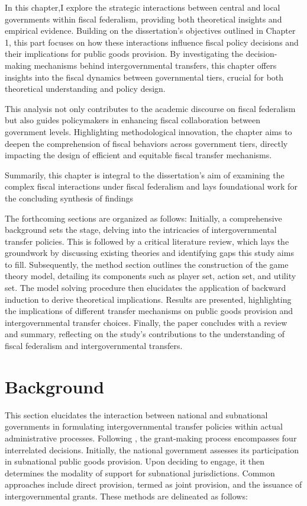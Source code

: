 In this chapter,I explore the strategic interactions between central and local governments within fiscal federalism, providing both theoretical insights and empirical evidence. Building on the dissertation's objectives outlined in Chapter 1, this part focuses on how these interactions influence fiscal policy decisions and their implications for public goods provision. By investigating the decision-making mechanisms behind intergovernmental transfers, this chapter offers insights into the fiscal dynamics between governmental tiers, crucial for both theoretical understanding and policy design.

This analysis not only contributes to the academic discourse on fiscal federalism but also guides policymakers in enhancing fiscal collaboration between government levels. Highlighting methodological innovation, the chapter aims to deepen the comprehension of fiscal behaviors across government tiers, directly impacting the design of efficient and equitable fiscal transfer mechanisms.

Summarily, this chapter is integral to the dissertation's aim of examining the complex fiscal interactions under fiscal federalism and lays foundational work for the concluding synthesis of findings


The forthcoming sections are organized as follows: Initially, a comprehensive background sets the stage, delving into the intricacies of intergovernmental transfer policies. This is followed by a critical literature review, which lays the groundwork by discussing existing theories and identifying gaps this study aims to fill. Subsequently, the method section outlines the construction of the game theory model, detailing its components such as player set, action set, and utility set. The model solving procedure then elucidates the application of backward induction to derive theoretical implications. Results are presented, highlighting the implications of different transfer mechanisms on public goods provision and intergovernmental transfer choices. Finally, the paper concludes with a review and summary, reflecting on the study's contributions to the understanding of fiscal federalism and intergovernmental transfers.

\section{Background}

This section elucidates the interaction between national and subnational governments in formulating intergovernmental transfer policies within actual administrative processes. Following \textcite{volden2007intergovernmental}, the grant-making process encompasses four interrelated decisions. Initially, the national government assesses its participation in subnational public goods provision. Upon deciding to engage, it then determines the modality of support for subnational jurisdictions. Common approaches include direct provision, termed as joint provision, and the issuance of intergovernmental grants. These methods are delineated as follows:

